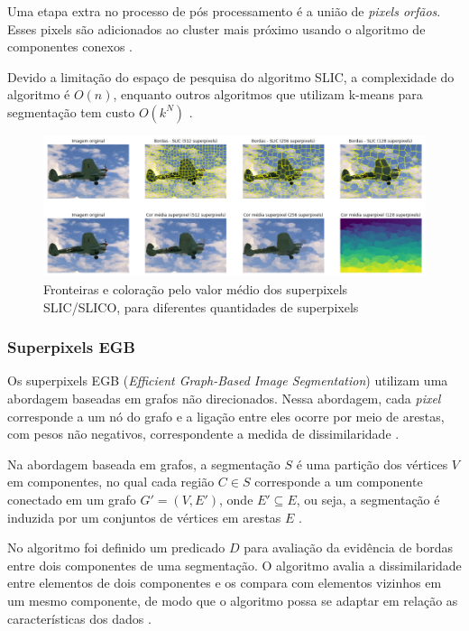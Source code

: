 \begin{document}
Uma etapa extra no processo de pós processamento é a união de \textit{pixels orfãos}. Esses pixels são adicionados ao cluster mais próximo usando o algoritmo de componentes conexos \cite{SLIC}.

Devido a limitação do espaço de pesquisa do algoritmo SLIC, a complexidade do algoritmo é $O(n)$, enquanto outros algoritmos que utilizam k-means para segmentação tem custo $O(k^N)$ \cite{SLIC}.

\begin{figure}[ht]
\centering
\includegraphics[width=1.\textwidth]{slic_segmentation_compare.png}
\caption{Fronteiras e coloração pelo valor médio dos superpixels SLIC/SLICO, para diferentes quantidades de superpixels}
\label{fig:SLICO}
\end{figure}


\subsubsection{Superpixels EGB} \label{sssec:egb}

Os superpixels EGB (\textit{Efficient Graph-Based Image Segmentation}) utilizam uma abordagem baseadas em grafos não direcionados. Nessa abordagem, cada \textit{pixel} corresponde a um nó do grafo e a ligação entre eles ocorre por meio de arestas, com pesos não negativos, correspondente a medida de dissimilaridade \cite{FELZENSZWALB}. 

Na abordagem baseada em grafos, a segmentação $S$ é uma partição dos vértices $V$ em componentes, no qual cada região $C \in S$ corresponde a um componente conectado em um grafo $G'=(V,E')$, onde $E' \subseteq E$, ou seja, a segmentação é induzida por um conjuntos de vértices em arestas $E$ \cite{FELZENSZWALB}.

No algoritmo foi definido um predicado $D$ para avaliação da evidência de bordas entre dois componentes de uma segmentação. O algoritmo avalia a dissimilaridade entre elementos de dois componentes e os compara com elementos vizinhos em um mesmo componente, de modo que o algoritmo possa se adaptar em relação as características dos dados \cite{FELZENSZWALB}. 
\end{document}

